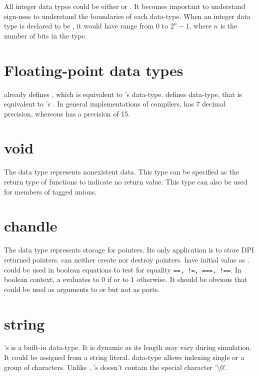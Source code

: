 All integer data types could be either \kwsigned or \kwunsigned. It becomes
important to understand sign-ness to understand the boundaries of each
data-type. When an integer data type is declared to be \kwunsigned, it
would have range from $0$ to $2^n-1$, where $n$ is the number of bits
in the type.

\section{Floating-point data types}
\lvlog already defines \kwreal, which is equivalent to \lc's
 data-type. \lsvlog defines \kwshortreal data-type, that is
equivalent to \lc's . In general implementations of \lc
compilers,  has 7 decimal precision, whereous 
has a precision of 15.

\section{void}
The \kwvoid data type represents nonexistent data. This type can be
specified as the return type of functions to indicate no return
value. This type can also be used for members of tagged unions.

\section{chandle}
The \kwchandle data type represents storage for pointers. Its only
application is to store DPI returned pointers. \lsvlog can neither
create nor destroy \lc pointers. \kwchandle have initial value as
\kwnull. \kwchandle could be used in boolean equations to test for
equality \texttt{==, !=, ===, !==}. In boolean context, a \kwchandle
evaluates to 0 if \kwnull or to 1 otherwise. It should be obvious that
\kwchandle could be used as arguments to \kwfunction or \kwtask but
not as ports.

\section{string}
\lsvlog's \kwstring is a built-in data-type. It is dynamic as its
length may vary during simulation. It could be assigned from a
string literal. \kwstring data-type allows indexing single or a group
of characters. Unlike \lc, \lsvlog's \kwstring doesn't contain the
special character '\textbackslash{}0'.


